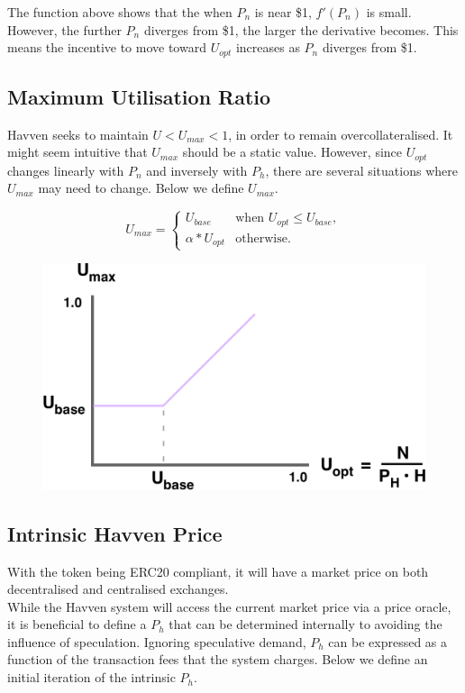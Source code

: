 \noindent The function above shows that the when $P_n$ is near \$1, $ f'(P_n) $ is small. However, the further $P_n$ diverges from \$1, the larger the derivative becomes. This means the incentive to move toward $U_{opt}$ increases as $P_n$ diverges from \$1.

\newpage

\subsection{Maximum Utilisation Ratio}

\noindent Havven seeks to maintain $U < U_{max} < 1$, in order to remain overcollateralised. It might seem intuitive that $U_{max}$ should be a static value. However, since $U_{opt}$ changes linearly with $P_n$ and inversely with $P_h$, there are several situations where $U_{max}$ may need to change. Below we define $U_{max}$.

\[
U_{max} = 
\begin{cases}
 U_{base} &\mbox{when } U_{opt} \leq U_{base}, \\ 
 \alpha * U_{opt} &\mbox{otherwise}.
 \end{cases}
\]

\begin{figure}[h!]
    \centering
    \includegraphics[width=.75\textwidth]{img/U_max}
\end{figure}

\newpage

\subsection{Intrinsic Havven Price} With the \HAV{} token being ERC20 compliant, it will have a market price on both decentralised and centralised exchanges. \\

\noindent While the Havven system will access the current market price via a price oracle, it is beneficial to define a $P_h$ that can be determined internally to avoiding the influence of speculation. Ignoring speculative demand, $P_h$ can be expressed as a function of the transaction fees that the system charges. Below we define an initial iteration of the intrinsic $P_h$.

